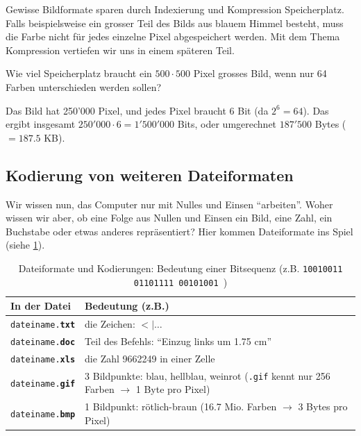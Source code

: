 Gewisse Bildformate sparen durch Indexierung und Kompression Speicherplatz. Falls beispielsweise ein grosser Teil des Bilds aus blauem Himmel besteht, muss die Farbe nicht für jedes einzelne Pixel abgespeichert werden. Mit dem Thema Kompression vertiefen wir uns in einem späteren Teil.

\begin{myexercise}
	Wie viel Speicherplatz braucht ein $500\cdot 500$ Pixel grosses Bild, wenn nur 64 Farben unterschieden werden sollen?
	\begin{myanswer}
		Das Bild hat 250'000 Pixel, und jedes Pixel braucht 6 Bit (da $2^6=64$). Das ergibt insgesamt $250'000\cdot 6 = 1'500'000$ Bits, oder umgerechnet $187'500$ Bytes ($=187.5$ KB).
	\end{myanswer}
\end{myexercise}

\subsection{Kodierung von weiteren Dateiformaten}
Wir wissen nun, das Computer nur mit Nulles und Einsen \enquote{arbeiten}. Woher wissen wir aber, ob eine Folge aus Nullen und Einsen ein Bild, eine Zahl, ein Buchstabe oder etwas anderes repräsentiert? Hier kommen Dateiformate ins Spiel (siehe \cref{table:formats-codes}).

\begin{table}[H]
	\centering
	\begin{tabular}{l|p{11cm}}
		\textbf{In der Datei}           & \textbf{Bedeutung (z.B.)}                                                                                 \\\midrule
		\texttt{dateiname.\textbf{txt}} & die Zeichen: $<|\ldots$                                                                                   \\
		\texttt{dateiname.\textbf{doc}} & Teil des Befehls: \enquote{Einzug links um 1.75 cm}                                                       \\
		\texttt{dateiname.\textbf{xls}} & die Zahl 9662249 in einer Zelle                                                                           \\
		\texttt{dateiname.\textbf{gif}} & 3 Bildpunkte: blau, hellblau, weinrot (\texttt{.gif} kennt nur 256 Farben $\rightarrow$ 1 Byte pro Pixel) \\
		\texttt{dateiname.\textbf{bmp}} & 1 Bildpunkt: rötlich-braun (16.7 Mio. Farben $\rightarrow$ 3 Bytes pro Pixel)
	\end{tabular}
	\caption{Dateiformate und Kodierungen: Bedeutung einer Bitsequenz (z.B. \texttt{10010011   01101111   00101001
		})}
	\label{table:formats-codes}
\end{table}

